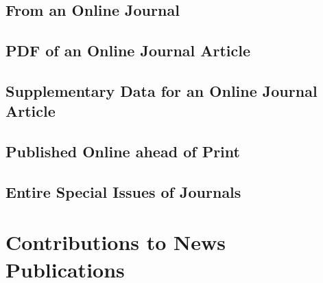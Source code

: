 \documentclass{article}
\begin{document}
\subsection{From an Online Journal} %
\label{sub:from_an_online_journal}
\begin{refsection}
	\printbibliography[heading=none]
\end{refsection}
\subsection{PDF of an Online Journal Article} %
\label{sub:pdf_of_an_online_journal_article}
\begin{refsection}
	\printbibliography[heading=none]
\end{refsection}
\subsection{Supplementary Data for an Online Journal Article} %
\label{sub:supplementary_data_for_an_online_journal_article}
\begin{refsection}
	\printbibliography[heading=none]
\end{refsection}
\subsection{Published Online ahead of Print} %
\label{sub:published_online_ahead_of_print}
\begin{refsection}
	\printbibliography[heading=none]
\end{refsection}
\subsection{Entire Special Issues of Journals} %
\label{sub:entire_special_issues_of_journals}
\begin{refsection}
	\printbibliography[heading=none]
\end{refsection}

\section{Contributions to News Publications} %
\label{sec:contributions_to_news_publications}
\end{document}
